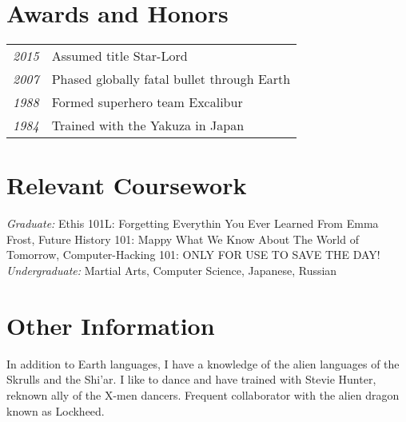 \documentclass{mycv}
\begin{document}
\noindent
\begin{minipage}[t]{0.6\textwidth}
  \section{Awards and Honors}
  \begin{tabular}{l l}
    \noindent \emph{2015} & Assumed title Star-Lord \\
    \noindent \emph{2007} & Phased globally fatal bullet through Earth\\
    \noindent \emph{1988} & Formed superhero team Excalibur \\
    \noindent \emph{1984} & Trained with the Yakuza in Japan 

  \end{tabular}
\end{minipage}
\hspace{0.01\textwidth}
\begin{minipage}[t]{0.39\textwidth}        
  \section{Relevant Coursework}
  \noindent \emph{Graduate:}  Ethis 101L: Forgetting Everythin You Ever%
  Learned From Emma Frost, Future History 101: Mappy What We Know About%
  The World of Tomorrow, Computer-Hacking 101: ONLY FOR USE TO SAVE THE DAY!\\
  \noindent \emph{Undergraduate:} Martial Arts, Computer Science, Japanese, Russian
\end{minipage}

\section{Other Information}
\noindent  In addition to Earth languages, I have a knowledge of the alien languages of the Skrulls and the Shi'ar. I like to dance and have trained with Stevie Hunter, reknown ally of the X-men dancers. Frequent collaborator with the alien dragon known as Lockheed. 
\end{document}
